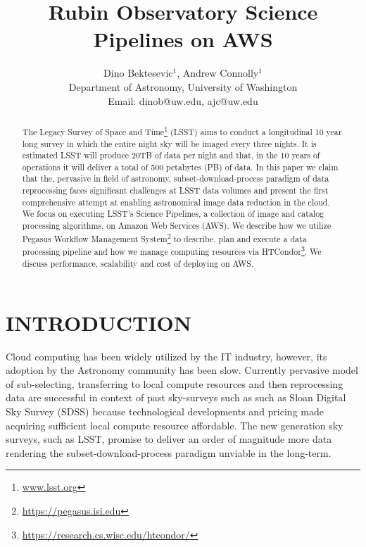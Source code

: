 \documentclass[a4paper, 10pt, conference]{ieeeconf}
\title{\LARGE \bf
Rubin Observatory Science Pipelines on AWS
}
\author{
    Dino Bektesevic$^1$, Andrew Connolly$^1$ \\
    Department of Astronomy, University of Washington \\ Email: dinob@uw.edu, ajc@uw.edu
    }
\begin{document}
\maketitle


\begin{abstract}

The Legacy Survey of Space and Time\footnote{\url{www.lsst.org}} (LSST) aims to conduct a longitudinal 10 year long survey in which the entire night sky will be imaged every three nights. It is estimated LSST will produce 20TB of data per night and that, in the 10 years of operations it will deliver a total of 500 petabytes (PB) of data. In this paper we claim that the, pervasive in field of astronomy, subset-download-process paradigm of data reprocessing faces significant challenges at LSST data volumes and present the first comprehensive attempt at enabling astronomical image data reduction in the cloud. We focus on executing LSST's Science Pipelines, a collection of image and catalog processing algorithms, on Amazon Web Services (AWS). We describe how we utilize Pegasus Workflow Management System\footnote{\url{https://pegasus.isi.edu}} to describe, plan and execute a data processing pipeline and how we manage computing resources via HTCondor\footnote{\url{https://research.cs.wisc.edu/htcondor/}}. We discuss performance, scalability and cost of deploying on AWS.
\end{abstract}

\section{INTRODUCTION}

Cloud computing has been widely utilized by the IT industry, however, its adoption by the Astronomy community has been slow. Currently pervasive model of sub-selecting, transferring to local compute resources and then reprocessing data are successful in context of past sky-surveys such as such as Sloan Digital Sky Survey\cite{York2000} (SDSS) because technological developments and pricing made acquiring sufficient local compute resource affordable. The new generation sky surveys, such as LSST, promise to deliver an order of magnitude more data rendering the subset-download-process paradigm unviable in the long-term. 
\end{document}
